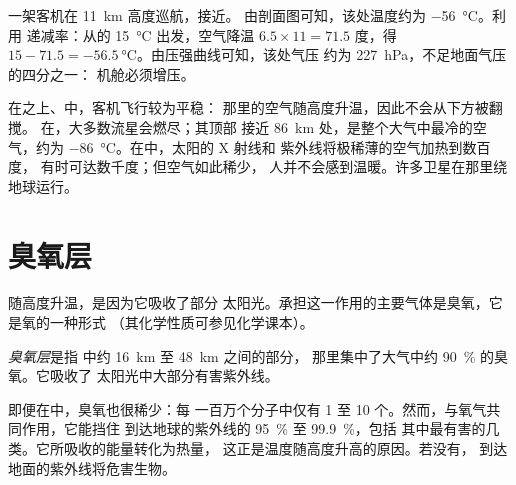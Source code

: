 \begin{example}[处于巡航高度的客机]\label{ex:g8:the-atmosphere:airliner}
一架客机在 \qty{11}{km} 高度巡航，接近。
由剖面图可知，该处温度约为 \qty{-56}{\degreeCelsius}。利用
递减率：从的 \qty{15}{\degreeCelsius} 出发，空气降温
$6.5 \times 11 = 71.5$ 度，得 $15 - 71.5 =
\qty{-56.5}{\degreeCelsius}$。由压强曲线可知，该处气压
约为 \qty{227}{hPa}，不足地面气压的四分之一：
机舱必须增压。
\end{example}

在之上、中，客机飞行较为平稳：
那里的空气随高度升温，因此不会从下方被翻搅。
在，大多数流星会燃尽；其顶部
接近 \qty{86}{km} 处，是整个大气中最冷的空气，约为
\qty{-86}{\degreeCelsius}。在中，太阳的 X 射线和
紫外线将极稀薄的空气加热到数百度，
有时可达数千度；但空气如此稀少，
人并不会感到温暖。许多卫星在那里绕地球运行。

\section{臭氧层}

随高度升温，是因为它吸收了部分
太阳光。承担这一作用的主要气体是臭氧，它是氧的一种形式
（其化学性质可参见化学课本）。

\begin{definition}[臭氧层]\label{def:g8:the-atmosphere:ozone-layer}
\emph{臭氧层}是指
中约 \qty{16}{km} 至 \qty{48}{km} 之间的部分，
那里集中了大气中约 90~\% 的臭氧。它吸收了
太阳光中大部分有害紫外线。
\end{definition}

即便在中，臭氧也很稀少：每
一百万个分子中仅有 1 至 10 个。然而，与氧气共同作用，它能挡住
到达地球的紫外线的 95~\% 至 99.9~\%，包括
其中最有害的几类。它所吸收的能量转化为热量，
这正是温度随高度升高的原因。若没有，
到达地面的紫外线将危害生物。

